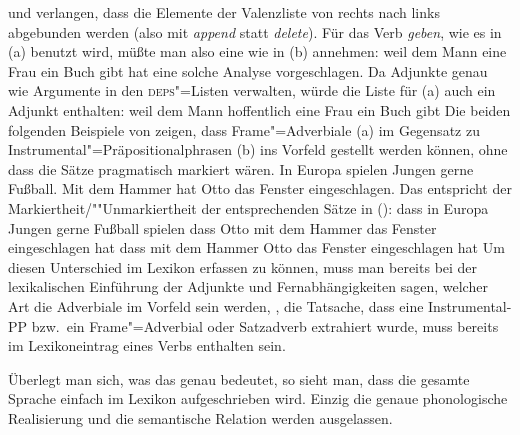 und verlangen, dass die Elemente der Valenzliste von rechts nach links abgebunden werden
(also mit \emph{append} statt \emph{delete}). Für das Verb \emph{geben}, wie es in (a)
benutzt wird, müßte man also eine \compsl wie in (b) annehmen:
\eal
\ex weil dem Mann eine Frau ein Buch gibt
\ex {}
\zl
\citet{Uszkoreit86b} hat eine solche Analyse vorgeschlagen.
Da \citet*{BMS2001a} Adjunkte genau wie Argumente in den \textsc{deps}"=Listen verwalten, würde die Liste
für (a) auch ein Adjunkt enthalten:
\eal
\ex weil dem Mann hoffentlich eine Frau ein Buch gibt
\ex {}
\zl
Die beiden folgenden Beispiele von \citet{Frey2004a} zeigen, dass
Frame"=Adverbiale (a) im Gegensatz zu Instrumental"=Präpositionalphrasen (b) ins
Vorfeld gestellt werden können, ohne dass die Sätze pragmatisch markiert wären.
\eal
\ex In Europa spielen Jungen gerne Fußball. 
\ex Mit dem Hammer hat Otto das Fenster eingeschlagen.
\zl
Das entspricht der Markiertheit/""Unmarkiertheit der entsprechenden Sätze in ():
\eal
\ex dass in Europa Jungen gerne Fußball spielen
\ex dass Otto mit dem Hammer das Fenster eingeschlagen hat
\ex dass mit dem Hammer Otto das Fenster eingeschlagen hat
\zl
Um diesen Unterschied im Lexikon erfassen zu können, muss man bereits bei der lexikalischen
Einführung der Adjunkte und Fernabhängigkeiten sagen, welcher Art die Adverbiale im Vorfeld
sein werden, \dash, die Tatsache, dass eine Instrumental-PP bzw.\ ein Frame"=Adverbial oder Satzadverb
extrahiert wurde, muss bereits im Lexikoneintrag eines Verbs enthalten sein.

Überlegt man sich, was das genau bedeutet, so sieht man, dass die gesamte Sprache einfach im Lexikon
aufgeschrieben wird. Einzig die genaue phonologische Realisierung und die semantische Relation
werden ausgelassen. 

